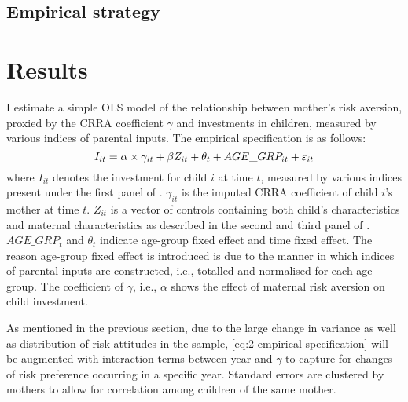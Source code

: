 \documentclass[]{article}
\begin{document}
\subsection{Empirical strategy}




\section{Results}
I estimate a simple OLS model of the relationship between mother's risk aversion, proxied by the CRRA coefficient $\gamma$ and investments in children, measured by various indices of parental inputs. The empirical specification is as follows:
\begin{equation}
	I_{it} = \alpha \times \gamma_{it} + \beta{\boldmath Z_{it}} + \theta_t + AGE\_GRP_{it} + \varepsilon_{it}
	\label{eq:2-empirical-specification}
\end{equation}
where $I_{it}$ denotes the investment for child $i$ at time $t$, measured by various indices present under the first panel of . $\gamma_{it}$ is the imputed CRRA coefficient of child $i$'s mother at time $t$. $Z_{it}$ is a vector of controls containing both child's characteristics and maternal characteristics as described in the second and third panel of . $AGE\_GRP_t$ and $\theta_t$ indicate age-group fixed effect and time fixed effect. The reason age-group fixed effect is introduced is due to the manner in which indices of parental inputs are constructed, i.e., totalled and normalised for each age group. The coefficient of $\gamma$, i.e., $\alpha$ shows the effect of maternal risk aversion on child investment. 

As mentioned in the previous section, due to the large change in variance as well as distribution of risk attitudes in the sample, \eqref{eq:2-empirical-specification} will be augmented with interaction terms between year and $\gamma$ to capture for changes of risk preference occurring in a specific year. Standard errors are clustered by mothers to allow for correlation among children of the same mother. 
\end{document}
